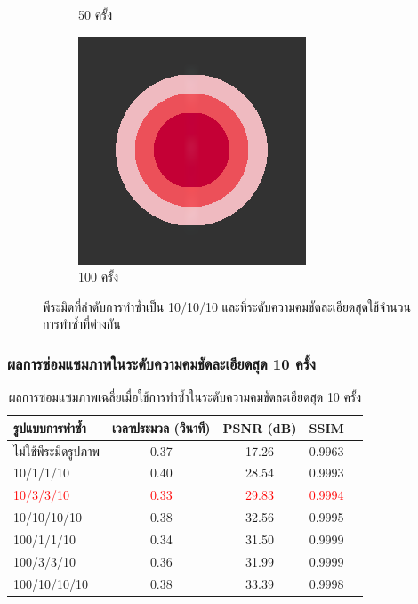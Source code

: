 \documentclass[xcolor=dvipsnames, xetex,serif]{beamer}
\numberwithin{equation}{section}
\begin{document}
\begin{frame}
\begin{figure}[H]
\begin{subfigure}{0.4\linewidth}
                \caption{50 ครั้ง}
            \end{subfigure}
            \begin{subfigure}{0.4\linewidth}
                \centering
                \includegraphics[width=0.6\linewidth]{images/just10enough/only100time.png}			
                \caption{100 ครั้ง}
            \end{subfigure}
            \caption{{\footnotesize พีระมิดที่ลำดับการทำซ้ำเป็น 10/10/10 และที่ระดับความคมชัดละเอียดสุดใช้จำนวนการทำซ้ำที่ต่างกัน}}
        \end{figure}
    \end{frame}
    \begin{frame}
        \frametitle{ผลการซ่อมแซมภาพในระดับความคมชัดละเอียดสุด 10 ครั้ง}
        \begin{table}[H]
            \centering
            \begin{tabular}[ht]{|l|c|c|c|c|}
                \hline
                รูปแบบการทำซ้ำ  & เวลาประมวล  (วินาที) & PSNR (dB) & SSIM \\
                \hline
                ไม่ใช้พีระมิดรูปภาพ & 0.37 & 17.26 & 0.9963  \\
                10/1/1/10 & 0.40 & 28.54 & 0.9993 \\
                \textcolor{red}{10/3/3/10} & \textcolor{red}{0.33} & \textcolor{red}{29.83}  & \textcolor{red}{0.9994} \\
                10/10/10/10 & 0.38 & 32.56 & 0.9995 \\
                100/1/1/10 & 0.34 & 31.50 & 0.9999 \\
                100/3/3/10 & 0.36 & 31.99 & 0.9999 \\
                100/10/10/10 & 0.38 & 33.39 & 0.9998 \\
                \hline
            \end{tabular}
            \caption{{\small ผลการซ่อมแซมภาพเฉลี่ยเมื่อใช้การทำซ้ำในระดับความคมชัดละเอียดสุด 10 ครั้ง}}
        \end{table}	
    \end{frame}
\end{document}
